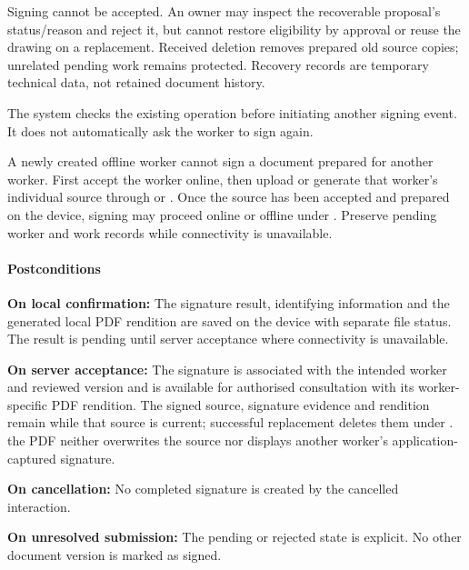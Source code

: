 \begin{description}[style=nextline]
    \item[A10 --- The source is withdrawn or deleted.]
    Signing cannot be accepted. An owner may inspect the recoverable proposal's
    status/reason and reject it, but cannot restore eligibility by approval or
    reuse the drawing on a replacement. Received deletion removes prepared old
    source copies; unrelated pending work remains protected. Recovery records are
    temporary technical data, not retained document history.

    \item[A11 --- The submission outcome is uncertain.]
    The system checks the existing operation
    before initiating another signing event.
    It does not automatically ask
    the worker to sign again.
\item[A12 --- Worker created in the field.] A newly created offline worker cannot
sign a document prepared for another worker. First accept the worker online, then
upload or generate that worker's individual source through  or
. Once the source has been accepted and prepared on the device,
signing may proceed online or offline under . Preserve pending
worker and work records while connectivity is unavailable.
\end{description}

\paragraph{Postconditions}

\textbf{On local confirmation:}
The signature result, identifying information
and the generated local PDF rendition are saved on the device with separate file status.
The result is pending until server acceptance
where connectivity is unavailable.

\textbf{On server acceptance:}
The signature is associated with
the intended worker and reviewed version
and is available for authorised consultation with its worker-specific PDF rendition.
The signed source, signature evidence and rendition remain while that source is current; successful replacement deletes them under . the PDF neither
overwrites the source nor displays another worker's application-captured signature.

\textbf{On cancellation:}
No completed signature is created
by the cancelled interaction.

\textbf{On unresolved submission:}
The pending or rejected state is explicit.
No other document version is marked as signed.

